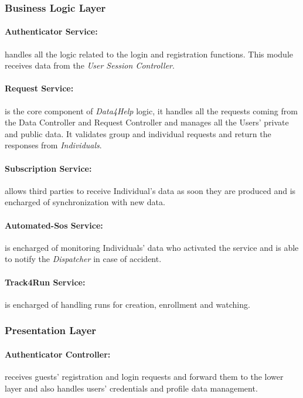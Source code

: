 \documentclass[a4paper]{article}
\begin{document}
    \subsubsection{Business Logic Layer}

    \paragraph{Authenticator Service:}
    handles all the logic related to the login and registration functions. This module receives data from the \textit{User Session Controller}.

    \paragraph{Request Service:}
    is the core component of \textit{Data4Help} logic, it handles all the requests coming from the Data Controller and Request Controller and manages all the Users' private and public data. It validates group and individual requests and return the responses from \textit{Individuals}.
    
    \paragraph{Subscription Service:}
    allows third parties to receive Individual's data as soon they are produced and is encharged of synchronization with new data.
    
    \paragraph{Automated-Sos Service:}
    is encharged of monitoring Individuals' data who activated the service and is able to notify the \textit{Dispatcher} in case of accident.
    
    \paragraph{Track4Run Service:}
    is encharged of handling runs for creation, enrollment and watching.
    
    \subsubsection{Presentation Layer}
    
    \paragraph{Authenticator Controller:}
    receives guests' registration and login requests and forward them to the lower layer and also handles users' credentials and profile data management.
    
\end{document}
